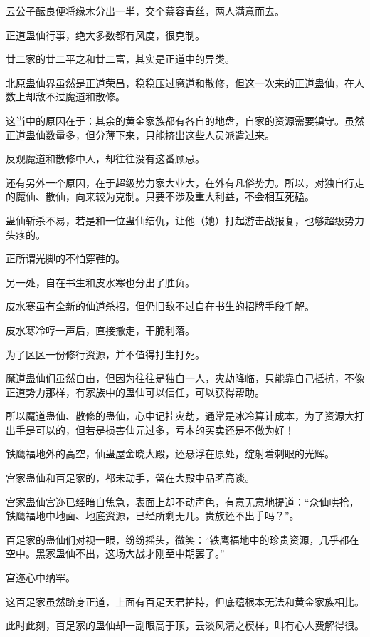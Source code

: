 \begin{this_body}
云公子酝良便将缘木分出一半，交个慕容青丝，两人满意而去。

正道蛊仙行事，绝大多数都有风度，很克制。

廿二家的廿二平之和廿二富，其实是正道中的异类。

北原蛊仙界虽然是正道荣昌，稳稳压过魔道和散修，但这一次来的正道蛊仙，在人数上却敌不过魔道和散修。

这当中的原因在于：其余的黄金家族都有各自的地盘，自家的资源需要镇守。虽然正道蛊仙数量多，但分薄下来，只能挤出这些人员派遣过来。

反观魔道和散修中人，却往往没有这番顾忌。

还有另外一个原因，在于超级势力家大业大，在外有凡俗势力。所以，对独自行走的魔仙、散仙，向来较为克制。只要不涉及重大利益，不会相互死磕。

蛊仙斩杀不易，若是和一位蛊仙结仇，让他（她）打起游击战报复，也够超级势力头疼的。

正所谓光脚的不怕穿鞋的。

另一处，自在书生和皮水寒也分出了胜负。

皮水寒虽有全新的仙道杀招，但仍旧敌不过自在书生的招牌手段千解。

皮水寒冷哼一声后，直接撤走，干脆利落。

为了区区一份修行资源，并不值得打生打死。

魔道蛊仙们虽然自由，但因为往往是独自一人，灾劫降临，只能靠自己抵抗，不像正道势力那样，有家族中的蛊仙可以信任，可以获得帮助。

所以魔道蛊仙、散修的蛊仙，心中记挂灾劫，通常是冰冷算计成本，为了资源大打出手是可以的，但若是损害仙元过多，亏本的买卖还是不做为好！

铁鹰福地外的高空，仙蛊屋金晓大殿，还悬浮在原处，绽射着刺眼的光辉。

宫家蛊仙和百足家的，都未动手，留在大殿中品茗高谈。

宫家蛊仙宫迩已经暗自焦急，表面上却不动声色，有意无意地提道：“众仙哄抢，铁鹰福地中地面、地底资源，已经所剩无几。贵族还不出手吗？”。

百足家的蛊仙们对视一眼，纷纷摇头，微笑：“铁鹰福地中的珍贵资源，几乎都在空中。黑家蛊仙不出，这场大战才刚至中期罢了。”

宫迩心中纳罕。

这百足家虽然跻身正道，上面有百足天君护持，但底蕴根本无法和黄金家族相比。

此时此刻，百足家的蛊仙却一副眼高于顶，云淡风清之模样，叫有心人费解得很。

\end{this_body}

